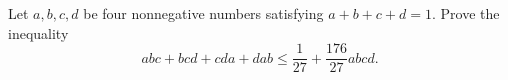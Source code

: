 Let $a, b, c, d$ be four nonnegative numbers satisfying $a + b + c + d = 1$. Prove the inequality
\[ abc + bcd + cda + dab \leq \frac{1}{27} + \frac{176}{27} abcd. \]

